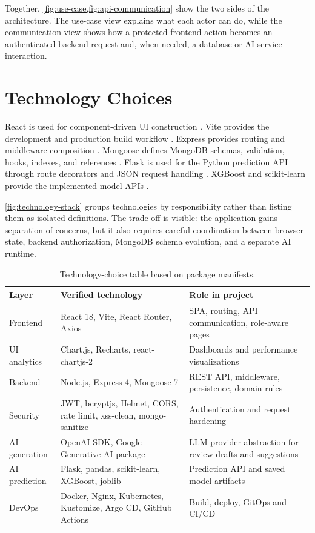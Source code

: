 Together, \cref{fig:use-case,fig:api-communication} show the two sides of the architecture. The use-case view explains what each actor can do, while the communication view shows how a protected frontend action becomes an authenticated backend request and, when needed, a database or AI-service interaction.

\section{Technology Choices}
React is used for component-driven UI construction \cite{reactDocs}. Vite provides the development and production build workflow \cite{viteDocs}. Express provides routing and middleware composition \cite{expressDocs}. Mongoose defines MongoDB schemas, validation, hooks, indexes, and references \cite{mongooseSchemas}. Flask is used for the Python prediction API through route decorators and JSON request handling \cite{flaskDocs}. XGBoost and scikit-learn provide the implemented model APIs \cite{xgboostDocs,sklearnRF}.



\cref{fig:technology-stack} groups technologies by responsibility rather than listing them as isolated definitions. The trade-off is visible: the application gains separation of concerns, but it also requires careful coordination between browser state, backend authorization, MongoDB schema evolution, and a separate AI runtime.

\begin{table}[H]\centering\small
\caption{Technology-choice table based on package manifests.}
\label{tab:technology-choice}
\begin{tabularx}{\textwidth}{p{}p{}Y}
\toprule
Layer & Verified technology & Role in project\\
\midrule
Frontend & React 18, Vite, React Router, Axios & SPA, routing, API communication, role-aware pages\\
UI analytics & Chart.js, Recharts, react-chartjs-2 & Dashboards and performance visualizations\\
Backend & Node.js, Express 4, Mongoose 7 & REST API, middleware, persistence, domain rules\\
Security & JWT, bcryptjs, Helmet, CORS, rate limit, xss-clean, mongo-sanitize & Authentication and request hardening\\
AI generation & OpenAI SDK, Google Generative AI package & LLM provider abstraction for review drafts and suggestions\\
AI prediction & Flask, pandas, scikit-learn, XGBoost, joblib & Prediction API and saved model artifacts\\
DevOps & Docker, Nginx, Kubernetes, Kustomize, Argo CD, GitHub Actions & Build, deploy, GitOps and CI/CD\\
\bottomrule
\end{tabularx}
\end{table}

